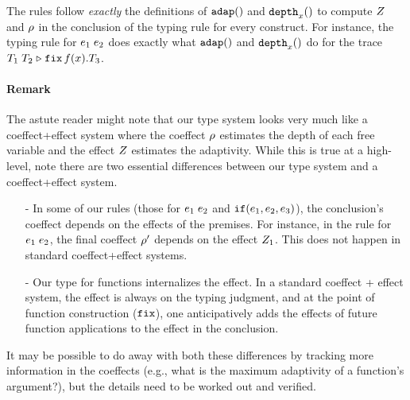 \documentclass[a4paper,11pt]{article}
\theoremstyle{definition}
\begin{document}
The rules follow \emph{exactly} the definitions of $\mathtt{adap}()$ and
$\mathtt{depth}_{x}()$ to compute $Z$ and $\rho$ in the conclusion of the
typing rule for every construct. For instance, the typing rule for
$e_1 \; e_2$ does exactly what $\mathtt{adap}()$ and $\mathtt{depth}_{x}()$
do for the trace $T_1 \; T_2 \mathrel{\triangleright} {\mathop{\mathtt{fix}} f(x).T_3}$.

\paragraph{Remark}
The astute reader might note that our type system looks very much like
a coeffect+effect system where the coeffect $\rho$ estimates the
depth of each free variable and the effect $Z$ estimates the
adaptivity. While this is true at a high-level, note there are two
essential differences between our type system and a coeffect+effect
system.
\begin{itemize}
\item[-] In some of our rules (those for $e_1 \; e_2$ and
  $\mathtt{if}(e_1, e_2, e_3)$), the conclusion's coeffect
  depends on the effects of the premises. For instance, in the rule
  for $e_1 \; e_2$, the final coeffect $\rho'$ depends on
  the effect $Z_1$. This does not happen in standard
  coeffect+effect systems.
\item[-] Our type for functions internalizes the effect. In a standard
  coeffect + effect system, the effect is always on the typing  judgment, and at the point of function construction ($\mathop{\mathtt{fix}}$), one
  anticipatively adds the effects of future function applications to
  the effect in the conclusion.
\end{itemize}
It may be possible to do away with both these differences by tracking
more information in the coeffects (e.g., what is the maximum
adaptivity of a function's argument?), but the details need to be
worked out and verified.
\end{document}
